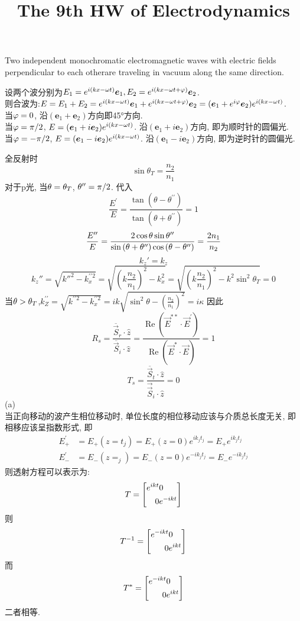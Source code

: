 \documentclass[UTF8,9pt]{ctexart}
\title{The 9th HW of Electrodynamics}
\begin{document}
 
\maketitle
{}
Two independent monochromatic electromagnetic waves with electric fields perpendicular to each otherare traveling in vacuum along the same direction.

设两个波分别为$E_1=e^{i(kx-\omega t)}\bm{e}_1,E_2=e^{i(kx-\omega t+\varphi)}\bm{e}_2$.\\
则合波为:$E=E_1+E_2 =e^{i(kx-\omega t)}\bm{e}_1+ e^{i(kx-\omega t+\varphi)}\bm{e}_2 = (\bm{e}_1+e^{i\varphi}\bm{e}_2)e^{i(kx-\omega t)}$. \\
当$\varphi=0$, 沿$(\bm{e}_1+\bm{e}_2)$方向即45°方向. \\
当$\varphi=\pi/2$, $E=(\bm{e}_1+i\bm{e}_2)e^{i(kx-\omega t)}$. 沿$(\bm{e}_1+i\bm{e}_2)$方向, 即为顺时针的圆偏光. \\
当$\varphi=-\pi/2$, $E=(\bm{e}_1-i\bm{e}_2)e^{i(kx-\omega t)}$. 沿$(\bm{e}_1-i\bm{e}_2)$方向, 即为逆时针的圆偏光. 

全反射时
$$ \sin\theta_{T}=\frac{n_{2}}{n_{1}} $$
对于p光, 当$\theta=\theta_T$, $\theta''=\pi/2$. 代入
$$ 
\frac{E^{\prime}}{E}=\frac{\tan \left(\theta-\theta^{\prime \prime}\right)}{\tan \left(\theta+\theta^{\prime \prime}\right)} = 1
 $$
 $$ 
\frac{E^{\prime \prime}}{E}=\frac{2 \cos \theta \sin \theta^{\prime \prime}}{\sin \left(\theta+\theta^{\prime \prime}\right) \cos \left(\theta-\theta^{\prime \prime}\right)} = \frac{2n_1}{n_2}
 $$
 $$k_z' = k_z$$
 $$ 
 k_z''=\sqrt{k''^2-k_{x}^{\prime \prime 2}}=\sqrt{\left(k \frac{n_{2}}{n_{1}}\right)^{2}-k_{x}^{2}}=\sqrt{\left(k \frac{n_{2}}{n_{1}}\right)^{2}-k^{2} \sin ^{2} \theta_{T}}=0
  $$
当$\theta>\theta_T$,$k_{Z}^{\prime \prime}=\sqrt{k^{\prime \prime 2}-k_{x}^{\prime \prime 2}}=i k \sqrt{\sin ^{2} \theta-\left(\frac{n_{2}}{n_{1}}\right)^{2}}=i \kappa$
因此$$ 
R_{s}=\frac{\overline{\vec{S}}_{r} \cdot \hat{z}}{\overline{\vec{S}}_{i} \cdot \hat{z}}=\frac{\operatorname{Re}\left(\vec{E}^{* *} \cdot \vec{E}^{\prime}\right)}{\operatorname{Re}\left(\vec{E}^{*} \cdot \vec{E}\right)}=1
 $$
 $$ 
T_{s}=\frac{\overline{\vec{S}}_{t} \cdot \hat{z}}{\overrightarrow{\vec{S}}_{i} \cdot \hat{z}}=0
 $$
(a)\\
当正向移动的波产生相位移动时, 单位长度的相位移动应该与介质总长度无关, 即相移应该呈指数形式, 即
$$ 
\begin{aligned} E_{+}^{\prime} &=E_{+}\left(z=t_{j}\right)=E_{+}(z=0) e^{i k_{j} t_{j}}=E_{+} e^{i k_{j} t_{j}} \\ E_{-}^{\prime} &=E_{-}\left(z=_{j}\right)=E_{-}(z=0) e^{-i k_{j} t_{j}}=E_{-} e^{-i k_{j} t_{j}} \end{aligned}
 $$
 则透射方程可以表示为: 
$$T=\left[\begin{aligned} e^{ikt}&0\\0&e^{-ikt} \end{aligned}\right]$$
则$$T^{-1} = \left[\begin{aligned} e^{-ikt}&0\\0&e^{ikt} \end{aligned}\right] $$
而
$$T^* = \left[\begin{aligned} e^{-ikt}&0\\0&e^{ikt} \end{aligned}\right]$$
二者相等. 
\end{document}

